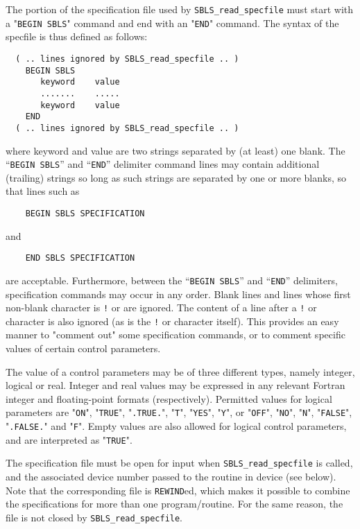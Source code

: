 \documentclass{galahad}
\newcommand{\packagename}{SBLS}
\begin{document}
The portion of the specification file used by 
{\tt \packagename\_read\_specfile}
must start
with a "{\tt BEGIN \packagename}" command and end with an 
"{\tt END}" command.  The syntax of the specfile is thus defined as follows:
\begin{verbatim}
  ( .. lines ignored by SBLS_read_specfile .. )
    BEGIN SBLS
       keyword    value
       .......    .....
       keyword    value
    END 
  ( .. lines ignored by SBLS_read_specfile .. )
\end{verbatim}
where keyword and value are two strings separated by (at least) one blank.
The ``{\tt BEGIN \packagename}'' and ``{\tt END}'' delimiter command lines 
may contain additional (trailing) strings so long as such strings are 
separated by one or more blanks, so that lines such as
\begin{verbatim}
    BEGIN SBLS SPECIFICATION
\end{verbatim}
and
\begin{verbatim}
    END SBLS SPECIFICATION
\end{verbatim}
are acceptable. Furthermore, 
between the
``{\tt BEGIN \packagename}'' and ``{\tt END}'' delimiters,
specification commands may occur in any order.  Blank lines and
lines whose first non-blank character is {\tt !} or {\tt *} are ignored. 
The content 
of a line after a {\tt !} or {\tt *} character is also 
ignored (as is the {\tt !} or {\tt *}
character itself). This provides an easy manner to "comment out" some 
specification commands, or to comment specific values 
of certain control parameters.  

The value of a control parameters may be of three different types, namely
integer, logical or real.
Integer and real values may be expressed in any relevant Fortran integer and
floating-point formats (respectively). Permitted values for logical
parameters are "{\tt ON}", "{\tt TRUE}", "{\tt .TRUE.}", "{\tt T}", 
"{\tt YES}", "{\tt Y}", or "{\tt OFF}", "{\tt NO}",
"{\tt N}", "{\tt FALSE}", "{\tt .FALSE.}" and "{\tt F}". 
Empty values are also allowed for 
logical control parameters, and are interpreted as "{\tt TRUE}".  

The specification file must be open for 
input when {\tt \packagename\_read\_specfile}
is called, and the associated device number 
passed to the routine in device (see below). 
Note that the corresponding 
file is {\tt REWIND}ed, which makes it possible to combine the specifications 
for more than one program/routine.  For the same reason, the file is not
closed by {\tt \packagename\_read\_specfile}.
\end{document}
